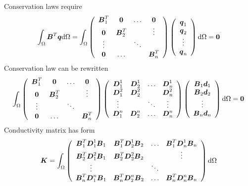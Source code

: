 Conservation laws require
\begin{equation}
\int_{\Omega} \mbox{\boldmath$B$}^T \mbox{\boldmath$q$} {\rm d}\Omega =
\int_{\Omega}
\left(\begin{array}{cccc}
\mbox{\boldmath$B$}_1^T & \mbox{\boldmath$0$}     & \ldots & \mbox{\boldmath$0$}
\\
\mbox{\boldmath$0$}     & \mbox{\boldmath$B$}_2^T &        & \vdots
\\
\vdots      &             & \ddots &
\\
\mbox{\boldmath$0$}     & \ldots      &        & \mbox{\boldmath$B$}_n^T
\end{array}\right)
\left(\begin{array}{c}
\mbox{\boldmath$q$}_1
\\
\mbox{\boldmath$q$}_2
\\
\vdots
\\
\mbox{\boldmath$q$}_n
\end{array}\right){\rm d}\Omega = \mbox{\boldmath$0$}
\end{equation}
Conservation law can be rewritten
\begin{equation}
\int_{\Omega}
\left(\begin{array}{cccc}
\mbox{\boldmath$B$}_1^T & \mbox{\boldmath$0$}     & \ldots & \mbox{\boldmath$0$}
\\
\mbox{\boldmath$0$}     & \mbox{\boldmath$B$}_2^T &        & \vdots
\\
\vdots      &             & \ddots &
\\
\mbox{\boldmath$0$}     & \ldots      &        & \mbox{\boldmath$B$}_n^T
\end{array}\right)
\left(\begin{array}{cccc}
\mbox{\boldmath$D$}_1^1 & \mbox{\boldmath$D$}_2^1 & \ldots & \mbox{\boldmath$D$}_n^1
\\
\mbox{\boldmath$D$}_1^2 & \mbox{\boldmath$D$}_2^2 &        & \mbox{\boldmath$D$}_n^2
\\
\vdots      &             & \ddots & \vdots
\\
\mbox{\boldmath$D$}_1^n & \mbox{\boldmath$D$}_2^n & \ldots & \mbox{\boldmath$D$}_n^n
\end{array}\right)
\left(\begin{array}{c}
\mbox{\boldmath$B$}_1\mbox{\boldmath$d$}_1
\\
\mbox{\boldmath$B$}_2\mbox{\boldmath$d$}_2
\\
\vdots
\\
\mbox{\boldmath$B$}_n\mbox{\boldmath$d$}_n
\end{array}\right){\rm d}\Omega = \mbox{\boldmath$0$}
\end{equation}
Conductivity matrix has form
\begin{equation}\label{condmatr}
\mbox{\boldmath$K$} =
 \int_{\Omega}
\left(\begin{array}{cccc}
\mbox{\boldmath$B$}_1^T \mbox{\boldmath$D$}_1^1 \mbox{\boldmath$B$}_1 & \mbox{\boldmath$B$}_1^T \mbox{\boldmath$D$}_2^1 \mbox{\boldmath$B$}_2 & \ldots & \mbox{\boldmath$B$}_1^T \mbox{\boldmath$D$}_n^1 \mbox{\boldmath$B$}_n
\\
\mbox{\boldmath$B$}_2^T \mbox{\boldmath$D$}_1^2 \mbox{\boldmath$B$}_1 & \mbox{\boldmath$B$}_2^T \mbox{\boldmath$D$}_2^2 \mbox{\boldmath$B$}_2 &        & \vdots
\\
\vdots                            &                                   & \ddots &
\\
\mbox{\boldmath$B$}_n^T \mbox{\boldmath$D$}_1^n \mbox{\boldmath$B$}_1 & \mbox{\boldmath$B$}_n^T \mbox{\boldmath$D$}_2^n \mbox{\boldmath$B$}_2 & \ldots & \mbox{\boldmath$B$}_n^T \mbox{\boldmath$D$}_n^n \mbox{\boldmath$B$}_n
\end{array}\right)
{\rm d}\Omega
\end{equation}


